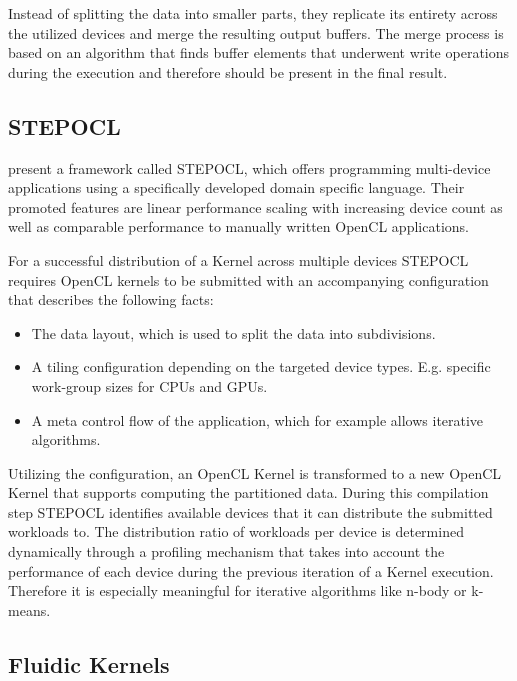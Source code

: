 Instead of splitting the data into smaller parts, they replicate its entirety across the utilized devices and merge the resulting output buffers. The merge process is based on an algorithm that finds buffer elements that underwent write operations during the execution and therefore should be present in the final result.


\subsection*{STEPOCL}

\citeauthor{stepocl} present a framework called STEPOCL, which offers programming multi-device applications using a specifically developed domain specific language\cite{stepocl}. Their promoted features are linear performance scaling with increasing device count as well as comparable performance to manually written OpenCL applications.

For a successful distribution of a Kernel across multiple devices STEPOCL requires OpenCL kernels to be submitted with an accompanying configuration that describes the following facts:
\begin{itemize}
    \item The data layout, which is used to split the data into subdivisions.
    \item A tiling configuration depending on the targeted device types. E.g. specific work-group sizes for CPUs and GPUs.
    \item A meta control flow of the application, which for example allows iterative algorithms.
\end{itemize}

Utilizing the configuration, an OpenCL Kernel is transformed to a new OpenCL Kernel that supports computing the partitioned data. During this compilation step STEPOCL identifies available devices that it can distribute the submitted workloads to. The distribution ratio of workloads per device is determined dynamically through a profiling mechanism that takes into account the performance of each device during the previous iteration of a Kernel execution. Therefore it is especially meaningful for iterative algorithms like n-body or k-means.

\subsection*{Fluidic Kernels}

